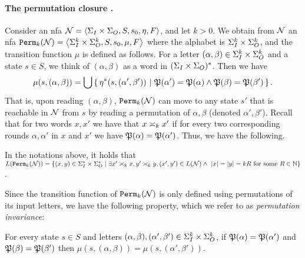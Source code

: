 \paragraph{The permutation closure .}
Consider an \gls{nfa} $\cN=\tup{\sI\times\sO,S,s_0,\eta,F}$, and let $k>0$. 
We obtain from $\cN$ an \gls{nfa} $\perm_k(\cN)=\tup{\sI^k \times \sO^k,S, s_0, \mu, F}$
where the alphabet is $\sI^k\times \sO^k$, and the transition function $\mu$ is defined as follows. For a letter $(\alpha,\beta)\in \sI^k \times \sO^k$ and a state $s\in S$, we think of $(\alpha,\beta)$ as a word in $(\sI\times \sO)^*$. Then we have
\begin{equation}
\label{test}
    \mu(s,(\alpha,\beta))=\bigcup\condset{\eta^*(s,(\alpha',\beta'))}{\fP(\alpha')=\fP(\alpha) \wedge \fP(\beta)=\fP(\beta')}.
\end{equation}
That is, upon reading $(\alpha,\beta)$, $\perm_k(\cN)$ can move to any state $s'$ that is reachable in $\cN$ from $s$
by reading a permutation of $\alpha,\beta$ (denoted $\alpha',\beta'$).
Recall that for two words $x,x'$ we have that $x\req[k]x'$ if for every two corresponding rounds $\alpha,\alpha'$ in $x$ and $x'$ we have $\fP(\alpha)=\fP(\alpha')$. 
Thus, we have the following.
\begin{observation}
	\label{obs:perm_closure_language}
	In the notations above, it holds that $L(\perm_k(\cN))=\{(x,y)\in \sI^*\times \sO^* \mid \exists x'\req[k] x, y'\req[k] y, (x',y')\in L(\cN) \wedge\ |x|=|y|=kR \text{ for some }R\in \bbN\}$.
	\end{observation}
Since the transition function of $\perm_k(\cN)$ is only defined using permutations of its input letters, we have the following property, which we refer to as \emph{permutation invariance}:
\begin{observation}
	\label{obs:perm_invariance}
	For every state $s\in S$ and letters $(\alpha,\beta), (\alpha',\beta')\in \sI^k \times \sO^k$, if $\fP(\alpha)=\fP(\alpha')$ and $\fP(\beta)=\fP(\beta')$ then $\mu(s,(\alpha,\beta))=\mu(s,(\alpha',\beta'))$.
\end{observation}

